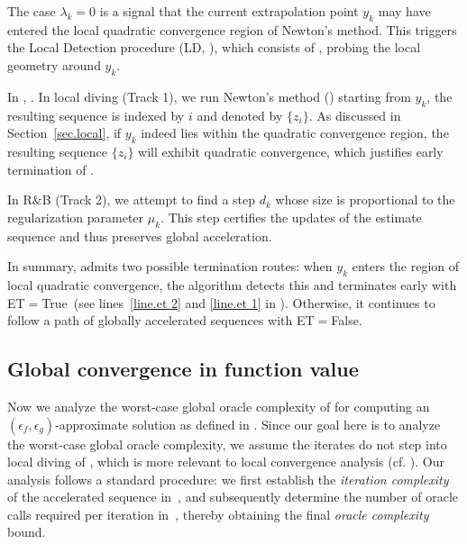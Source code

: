 \documentclass[moor,sglanonrev]{informs4}
\begin{document}
The case $\lambda_k = 0$ is a signal that the current extrapolation point $y_k$ may have entered the local quadratic convergence region of Newton's method. This triggers the Local Detection procedure (LD, ), which consists of , probing the local geometry around $y_k$.

In , .
In local diving ({Track 1}), we run Newton's method () starting from $y_k$, the resulting sequence is indexed by $i$ and denoted by $\{z_i\}$. As discussed in Section~\ref{sec.local}, if $y_k$ indeed lies within the quadratic convergence region, the resulting sequence $\{z_i\}$ will exhibit quadratic convergence, which justifies early termination of . 

In R\&B ({Track 2}), we attempt to find a step $d_k$ whose size is proportional to the regularization parameter $\mu_k$. This step certifies the updates of the estimate sequence and thus preserves global acceleration.

In summary,  admits two possible termination routes: when $y_k$ enters the region of local quadratic convergence, the algorithm detects this and terminates early with ET$=$True~(see lines~\ref{line.et 2} and \ref{line.et 1} in ). Otherwise, it continues to follow a path of globally accelerated sequences with ET$=$False.

\subsection{Global convergence in function value}
Now we analyze the worst-case global oracle complexity of  for computing an $(\epsilon_f,\epsilon_g)$-approximate solution as defined in . Since our goal here is to analyze the worst-case global oracle complexity, we assume the iterates do not step into local diving of , which is more relevant to local convergence analysis (cf. ). Our analysis follows a standard procedure: we first establish the \textit{iteration complexity} of the accelerated sequence in~, and subsequently determine the number of oracle calls required per iteration in~, thereby obtaining the final \textit{oracle complexity} bound.
\end{document}
